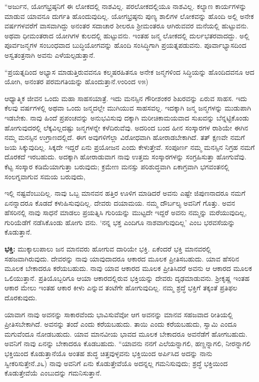 “ಅರ್ಜುನ, ಯೋಗಭ್ರಷ್ಠನಿಗೆ ಈ ಲೋಕದಲ್ಲಿ ನಾಶವಿಲ್ಲ. ಪರಲೋಕದಲ್ಲಿಯೂ ನಾಶವಿಲ್ಲ. ಕಲ್ಯಾಣ ಕಾರ್ಯಗಳನ್ನು ಮಾಡುವ ಯಾವನೂ ದುರ್ಗತಿ ಹೊಂದುವುದಿಲ್ಲ. ಯೋಗಭ್ರಷ್ಠನು ಪುಣ್ಯ ಶಾಲಿಗಳ ಲೋಕವನ್ನು ಹೊಂದಿ ಅಲ್ಲಿ ಅನೇಕ ವರ್ಷಗಳವರೆಗೆ ವಾಸವಾಗಿದ್ದು ಅನಂತರ ಸದಾಚಾರ ಶೀಲರೂ ಶ‍್ರೀಮಂತರೂ ಆಗಿರುವವರ ಮನೆಯಲ್ಲಿ ಹುಟ್ಟುವನು. ಅಥವಾ ಧೀಮಂತ\-ರಾದ ಯೋಗಿಗಳ ಕುಲದಲ್ಲಿ ಹುಟ್ಟುವನು. ಇಂತಹ ಜನ್ಮ ಲೋಕದಲ್ಲಿ ದುರ್ಲಭತರ\-ವಾದದ್ದು. ಅಲ್ಲಿ ಪೂರ್ವಜನ್ಮಗಳ ಸಂಬಂಧವಾದ ಬುದ್ಧಿಯೋಗವನ್ನು ಹೊಂದಿ ಸಂಸಿದ್ಧಿಗಾಗಿ ಪ್ರಯತ್ನಪಡುವನು. ಪೂರ್ವಾಭ್ಯಾಸದಿಂದ ಅಸ್ವತಂತ್ರನಾಗಿ ಅವನು ಎಳೆಯಲ್ಪಡುತ್ತಾನೆ.

“ಪ್ರಯತ್ನದಿಂದ ಅಭ್ಯಾಸ ಮಾಡುತ್ತಿರುವವನೂ ಕಲ್ಮಷರಹಿತನೂ ಅನೇಕ ಜನ್ಮಗಳಿಂದ ಸಿದ್ಧಿಯನ್ನು ಹೊಂದಿದವನೂ ಆದ ಯೋಗಿ, ಅನಂತರ ಪರಮಗತಿಯನ್ನು ಹೊಂದುತ್ತಾನೆ.೪ಂ\-ರಿಂದ ೪೫)

ಆಧ್ಯಾತ್ಮಿಕ ಜೀವನ ಒಂದು ಮಹಾ ಸಾಹಸಯಾತ್ರೆ. ಇದು ಮನಸ್ಸಿನ ಗೌರೀಶಂಕರ ಶಿಖರವನ್ನು ಏರುವ ಸಾಹಸ. ಇದು ಕೆಲವು ವರ್ಷಗಳಲ್ಲಿ ಅಥವಾ ಒಂದು ಜನ್ಮದಲ್ಲೇ ಮುಗಿಯುವ ಸಾಹಸವಲ್ಲ. ಇದಕ್ಕಾಗಿ ಜನ್ಮ ಜನ್ಮಗಳನ್ನು ಮುಡುಪಾಗಿ ಇಡಬೇಕು. ನಾವು ಹಿಂದೆ ಪ್ರಪಂಚವನ್ನು ಅನುಭವಿಸುವು ದಕ್ಕಾಗಿ ಮರೀಚಿಕಾಮಯವಾದ ಸುಖವನ್ನು ಬೆನ್ನಟ್ಟಿಕೊಂಡು ಹೋಗುವುದರಲ್ಲಿ ಲೆಕ್ಕವಿಲ್ಲದಷ್ಟು ಜನ್ಮಗಳನ್ನೇ ಕಳೆದಿರುವೆವು. ಅದರಿಂದ ಬಂದ ಹೀನ ಸಂಸ್ಕಾರಗಳ ರಾಶಿಯೇ ಈಗಿನ ನಮ್ಮ ಮನಸ್ಸಿನ ಉಗ್ರಾಣದಲ್ಲಿದೆ. ಈಗ ಅವುಗಳಿಗೆಲ್ಲಾ ವಿರೋಧವಾಗಿ ಹೋರಾಡಬೇಕಾಗಿದೆ. ತತ್ ಕ್ಷಣವೇ ನಮಗೆ ಜಯ ಸಿಕ್ಕುವುದಿಲ್ಲ. ಸಿಕ್ಕದೇ ಇದ್ದರೆ ಏನು ಪ್ರಯೋಜನ ಎಂದು ಕೇಳುತ್ತೇವೆ. ಸಂಪೂರ್ಣ ನಮ್ಮ ಮನಸ್ಸಿನ ನಿಗ್ರಹ ನಮಗೆ ದೊರಕದೆ ಇರಬಹುದು. ಅದಕ್ಕಾಗಿ ಹೋರಾಡುವಾಗ ನಾವು ಉತ್ತಮ ಸಂಸ್ಕಾರಗಳನ್ನು ಸಂಗ್ರಹಿಸುತ್ತಾ ಹೋಗುವೆವು. ಕೆಟ್ಟ ಸಂಸ್ಕಾರ ಕಡಿಮೆಯಾಗುತ್ತಾ ಬರುವುದು; ಕ್ರಮೇಣ ಮನಸ್ಸು ಪರಿಶುದ್ಧವಾಗಿ ಏಕಾಗ್ರವಾಗಿ ಭಗವಂತನಲ್ಲಿ ಸಂಲಗ್ನವಾಗುವ ಸಮಯ ಬರುವುದು,

ಇಲ್ಲಿ ನಷ್ಟವೆಂಬುದಿಲ್ಲ. ನಾವು ಒಬ್ಬ ಮಾನವನ ಹತ್ತಿರ ಊಳಿಗ ಮಾಡಿದರೆ ಅವನು ಎಷ್ಟೇ ಜಿಪುಣನಾದರೂ ನಮಗೆ ಏನನ್ನಾದರೂ ಕೊಡದೆ ಕಳುಹಿಸುವುದಿಲ್ಲ. ದೇವರು ದಯಾಮಯ. ನಮ್ಮ ದೌರ್ಬಲ್ಯ ಅವನಿಗೆ ಗೊತ್ತು. ಅವನ ಹೆಸರಿನಲ್ಲಿ ನಾವು ಸಾಧನೆ ಮಾಡಲು ಪ್ರಯತ್ನಿಸಿ ಗುರಿಯನ್ನು ಮುಟ್ಟದೇ ಇದ್ದರೆ ಅವನು ನಮ್ಮನ್ನು ಮರೆಯುವುದಿಲ್ಲ, ಗುರಿಯೆಡೆಗೆ ನಡೆಸಿಕೊಂಡು ಹೋಗು ವನು. ‘ನನ್ನ ಭಕ್ತ ಎಂದಿಗೂ ನಾಶವಾಗುವುದಿಲ್ಲ’ ಎಂಬ ಭರವಸೆಯನ್ನು ಕೊಡುತ್ತಾನೆ.

\textbf{ಭಕ್ತಿ:} ಮುಕ್ಕಾಲುಪಾಲು ಜನ ಮಾನವರು ಹೋಗುವ ದಾರಿಯೇ ಭಕ್ತಿ. ಏಕೆಂದರೆ ಭಕ್ತಿ ಮಾನವರಲ್ಲಿ ಸಹಜವಾಗಿರುವುದು. ದೇವರನ್ನು ನಾವು ಯಾವುದಾದರೂ ಆಕಾರದ ಮೂಲಕ ಪ್ರೀತಿಸಬಹುದು. ಯಾವ ಹೆಸರಿನ ಮೂಲಕ ಬೇಕಾದರೂ ಕರೆಯಬಹುದು. ನಾವು ಯಾವ ಆಕಾರದ ಮೂಲಕ ಪ್ರೀತಿಸಿದರೆ ಅವನು ಆ ಆಕಾರದ ಮೂಲಕ ಒಲಿಯುತ್ತಾನೆ. ಪ್ರತಿಯೊಬ್ಬರಿಗೂ ಆಯಾ ಆಕಾರದಲ್ಲಿರುವ ಭಕ್ತಿಯನ್ನು ದೇವರು ದೃಢಮಾಡುವನು. ಶ‍್ರೀಕೃಷ್ಣ ಇಂತಹ ಆಕಾರ ಮೇಲು ಇಂತಹ ಆಕಾರ ಕೀಳು ಎನ್ನುವ ತಂಟೆಗೇ ಹೋಗುವುದಿಲ್ಲ. ನಮ್ಮ ಶ್ರದ್ಧೆ ಭಕ್ತಿಗೆ ತಕ್ಕಂತೆ ಪ್ರತಿಫಲ ದೊರಕುವುದು.

ಯಾವಾಗ ನಾವು ಅವನನ್ನು ಸಾಕಾರವೆಂದು ಭಾವಿಸುವೆವೋ ಆಗ ಅವನನ್ನು ಮಾನವ ಸಹಜವಾದ ರೀತಿಯಲ್ಲಿ ಪ್ರೀತಿಸಬೇಕಾಗಿದೆ. ಅವನನ್ನು ತಂದೆ ಎಂದು ಕರೆಯಬಹುದು. ತಾಯಿ ಎಂದು ಕರೆಯಬಹುದು, ಸ್ವಾಮಿ ಎಂದೂ ಮಗುವೆಂದೂ ನೋಡಬಹುದು. ಯಾವ ಮಾನವೀಯ ಭಾವದ ಮೂಲಕ ಬೇಕಾದರೂ ಅವನೆಡೆಗೆ ಹೋಗಬಹುದು. ಅವನಿಗೆ ನಾವು ಏನನ್ನು ಬೇಕಾದರೂ ಕೊಡಬಹುದು. “ಯಾವನು ನನಗೆ ಎಲೆಯನ್ನಾಗಲಿ, ಹಣ್ಣನ್ನಾಗಲಿ, ನೀರನ್ನಾಗಲಿ ಭಕ್ತಿಯಿಂದ ಕೊಡುತ್ತಾನೆಯೊ ಅಂತಹ ಶುದ್ಧ ಚಿತ್ತವುಳ್ಳವನು ಭಕ್ತಿಯಿಂದ ಅರ್ಪಿಸಿದ ಅದನ್ನು ನಾನು ಸ್ವೀಕರಿಸುತ್ತೇನೆ.೨೬) ನಾವು ಅವನಿಗೆ ಏನು ಕೊಡುತ್ತೇವೆಯೊ ಅದನ್ನಲ್ಲ ಗಮನಿಸುವುದು; ಶ್ರದ್ಧೆ ಭಕ್ತಿಯಿಂದ ಕೊಡುತ್ತೇವೆಯೆ ಎಂಬುದನ್ನು ಗಮನಿಸುತ್ತಾನೆ.

